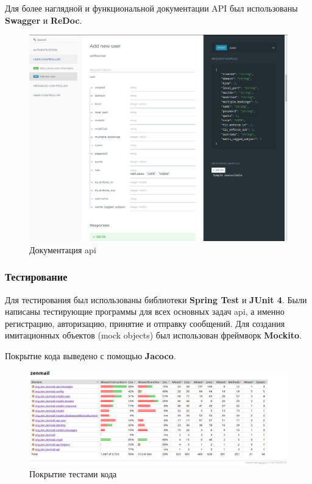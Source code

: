 \documentclass{article}
\begin{document}
Для более наглядной и функциональной документации API был использованы \textbf{Swagger} и \textbf{ReDoc}. 

\begin{figure}[H]
        \begin{flushleft}        \centerline{\includegraphics[scale=0.4]{swagger.png}}
        \caption{Документация api}
        \end{flushleft}
\end{figure}

\subsubsection{Тестирование}
Для тестирования был использованы библиотеки \textbf{Spring Test} и \textbf{JUnit 4}. Были написаны тестирующие программы для всех основных задач api, а именно регистрацию, авторизацию, принятие и отправку сообщений. Для создания имитационных объектов (mock objects) был использован фреймворк \textbf{Mockito}.

Покрытие кода выведено с помощью \textbf{Jacoco}.

\begin{figure}[H]
        \begin{flushleft}        \centerline{\includegraphics[scale=0.4]{codecov.png}}
        \caption{Покрытие тестами кода}
        \end{flushleft}
\end{figure}
\end{document}
